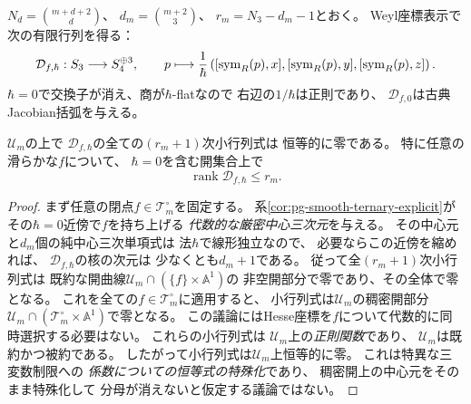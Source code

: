 $N_d=\binom{m+d+2}{d}$、
$d_m=\binom{m+2}{3}$、
$r_m=N_3-d_m-1$とおく。
Weyl座標表示で次の有限行列を得る：
\begin{equation}
 \mathcal D_{f,\hbar}:S_3\longrightarrow S_4^{\oplus3},
 \qquad
 p\longmapsto
 \frac1\hbar\left(
 [\operatorname{sym}_R(p),x],[\operatorname{sym}_R(p),y],[\operatorname{sym}_R(p),z]\right).
 \label{eq:pg-det-commutator-matrix}
\end{equation}
$\hbar=0$で交換子が消え、商が$\hbar$-flatなので
右辺の$1/\hbar$は正則であり、
$\mathcal D_{f,0}$は古典Jacobian括弧を与える。

\begin{lemma}[量子交換子行列の普遍階数恒等式]
\label{lem:pg-det-universal-rank}
$\mathcal U_m$の上で
$\mathcal D_{f,\hbar}$の全ての$(r_m+1)$次小行列式は
恒等的に零である。
特に任意の滑らかな$f$について、
$\hbar=0$を含む開集合上で
\begin{equation}
 \operatorname{rank}\mathcal D_{f,\hbar}\le r_m.
 \label{eq:pg-det-universal-rank}
\end{equation}
\end{lemma}
\begin{proof}
まず任意の閉点$f\in\mathcal T_m^\circ$を固定する。
系\ref{cor:pg-smooth-ternary-explicit}が
その$\hbar=0$近傍で$f$を持ち上げる
\emph{代数的な厳密中心三次元}を与える。
その中心元と$d_m$個の純中心三次単項式は
法$\hbar$で線形独立なので、
必要ならこの近傍を縮めれば、
$\mathcal D_{f,\hbar}$の核の次元は
少なくとも$d_m+1$である。
従って全$(r_m+1)$次小行列式は
既約な開曲線$\mathcal U_m\cap(\{f\}\times\mathbb A^1)$の
非空開部分で零であり、その全体で零となる。
これを全ての$f\in\mathcal T_m^\circ$に適用すると、
小行列式は$\mathcal U_m$の稠密開部分
$\mathcal U_m\cap(\mathcal T_m^\circ\times\mathbb A^1)$で零となる。
この議論にはHesse座標を$f$について代数的に同時選択する必要はない。
これらの小行列式は
$\mathcal U_m$上の\emph{正則関数}であり、
$\mathcal U_m$は既約かつ被約である。
したがって小行列式は$\mathcal U_m$上恒等的に零。
これは特異な三変数制限への
\emph{係数についての恒等式の特殊化}であり、
稠密開上の中心元をそのまま特殊化して
分母が消えないと仮定する議論ではない。
\end{proof}

